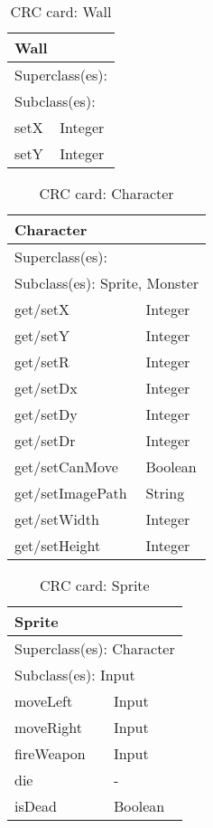 \begin{table}[]
\centering
\label{crc_wall}
\begin{tabular}{|l|l|}
\hline
\multicolumn{2}{|l|}{Wall} \\ \hline
\multicolumn{2}{|l|}{Superclass(es):} \\ \hline
\multicolumn{2}{|l|}{Subclass(es):} \\ \hline
setX           & Integer \\ \hline
setY           & Integer\\ \hline
\end{tabular}
\caption{CRC card: Wall}
\end{table}

\begin{table}[]
\centering
\label{crc_character}
\begin{tabular}{|l|l|}
\hline
\multicolumn{2}{|l|}{Character} \\ \hline
\multicolumn{2}{|l|}{Superclass(es):} \\ \hline
\multicolumn{2}{|l|}{Subclass(es): Sprite, Monster} \\ \hline
get/setX           & Integer \\ \hline
get/setY           & Integer \\ \hline
get/setR           & Integer \\ \hline
get/setDx          & Integer \\ \hline
get/setDy          & Integer \\ \hline
get/setDr          & Integer \\ \hline
get/setCanMove     & Boolean \\ \hline
get/setImagePath   & String \\ \hline
get/setWidth       & Integer \\ \hline
get/setHeight      & Integer \\ \hline
\end{tabular}
\caption{CRC card: Character}
\end{table}

\begin{table}[]
\centering
\label{crc_sprite}
\begin{tabular}{|l|l|}
\hline
\multicolumn{2}{|l|}{Sprite} \\ \hline
\multicolumn{2}{|l|}{Superclass(es): Character} \\ \hline
\multicolumn{2}{|l|}{Subclass(es): Input} \\ \hline
moveLeft            & Input \\ \hline
moveRight           & Input \\ \hline
fireWeapon          & Input \\ \hline
die                 & - \\ \hline
isDead              & Boolean \\ \hline
\end{tabular}
\caption{CRC card: Sprite}
\end{table}

